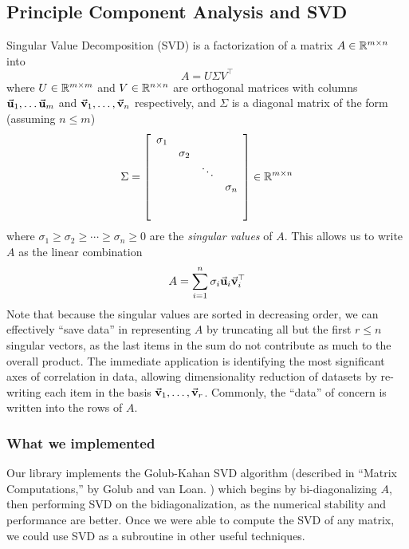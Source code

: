 \subsection{Principle Component Analysis and SVD}

Singular Value Decomposition (SVD) is a factorization of a matrix $A \in \mathbb{R}^{m \times n}$ into
\[
    A = U \Sigma V^\top
\]
where $U \in \mathbb{R}^{m \times m}$ and $V \in \mathbb{R}^{n \times n}$ are orthogonal matrices with 
columns $\vec{\mathbf{u}}_1, \ldots \vec{\mathbf{u}}_m$ and $\vec{\mathbf{v}}_1, \ldots, \vec{\mathbf{v}}_n$ respectively, and $\Sigma$
is a diagonal matrix of the form (assuming $n \leq m$)
\[
    \Sigma = \left[
        \begin{array}{cccc}
            \sigma_1 & & & \\
            & \sigma_2 & & \\
            & & \ddots & \\
            & & & \sigma_n \\
            & & & \\
            & & & 
        \end{array}
    \right] \in \mathbb{R}^{m \times n}
\]
where $\sigma_1 \geq \sigma_2 \geq \cdots \geq \sigma_n \geq 0$ are the \emph{singular values} of $A$.
This allows us to write $A$ as the linear combination
\[
    A = \sum_{i = 1}^n \sigma_i \vec{\mathbf{u}}_i \vec{\mathbf{v}}_i^\top
\]
Note that because the singular values are sorted in decreasing order, we can effectively ``save data'' in 
representing $A$ by truncating all but the first $r \leq n$ singular vectors, as the last items in the sum do not 
contribute as much to the 
overall product. The immediate application is identifying the most significant axes of correlation in data, allowing 
dimensionality reduction of datasets by re-writing each item in the basis $\vec{\mathbf{v}}_1, \ldots, \vec{\mathbf{v}}_r$.
Commonly, the ``data'' of concern is written into the rows of $A$.

\subsubsection{What we implemented}

Our library implements the Golub-Kahan SVD algorithm (described in ``Matrix Computations,'' by Golub and van Loan.
\textcolor{blue}{\autocite{golub13}}) which begins by bi-diagonalizing $A$, then performing SVD on the bidiagonalization,
as the numerical stability and performance are better. Once we were able to compute the SVD of any matrix, we could use 
SVD as a subroutine in other useful techniques.

